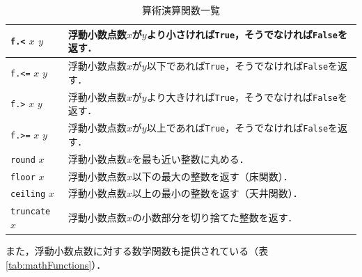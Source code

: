 \begin{table}[h]
\begin{center}
\begin{tabular}{ | l | p{9cm} |}
    \texttt{f.<} $x$ $y$ & 浮動小数点数$x$が$y$より小さければ\texttt{True}，そうでなければ\texttt{False}を返す． \\ \hline
    \texttt{f.<=} $x$ $y$ & 浮動小数点数$x$が$y$以下であれば\texttt{True}，そうでなければ\texttt{False}を返す． \\ \hline
    \texttt{f.>} $x$ $y$ & 浮動小数点数$x$が$y$より大きければ\texttt{True}，そうでなければ\texttt{False}を返す． \\ \hline
    \texttt{f.>=} $x$ $y$ & 浮動小数点数$x$が$y$以上であれば\texttt{True}，そうでなければ\texttt{False}を返す． \\ \hline
    \texttt{round} $x$ & 浮動小数点数$x$を最も近い整数に丸める． \\ \hline
    \texttt{floor} $x$ & 浮動小数点数$x$以下の最大の整数を返す（床関数）． \\ \hline
    \texttt{ceiling} $x$ & 浮動小数点数$x$以上の最小の整数を返す（天井関数）． \\ \hline
    \texttt{truncate} $x$ & 浮動小数点数$x$の小数部分を切り捨てた整数を返す． \\ \hline
    \end{tabular}
\end{center}
    \caption{算術演算関数一覧}
    \label{tab:arithFunctions}
\end{table}

また，浮動小数点数に対する数学関数も提供されている（表\ref{tab:mathFunctions}）．


